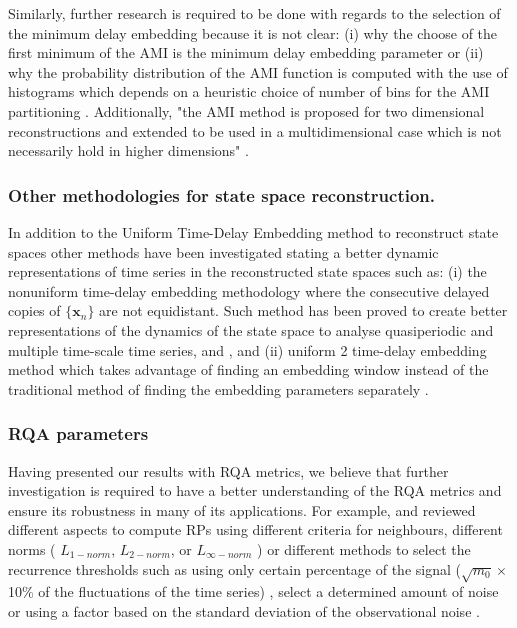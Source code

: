 Similarly, further research is required to be done with regards to the 
selection of the minimum delay embedding because it is not clear:
(i) why the choose of the first minimum of the AMI is the minimum delay 
embedding parameter \citep{kantz2003} or 
(ii) why the probability distribution of the AMI function 
is computed with the use of histograms which depends on a heuristic 
choice of number of bins for the AMI partitioning \citep{garcia2005e71}. 
Additionally, "the AMI method is proposed for two dimensional 
reconstructions and extended to be used in a multidimensional case 
which is not necessarily hold in higher dimensions" 
\citep[p. 156]{gomezgarcia2014}.


\subsubsection{Other methodologies for state space reconstruction.}
In addition to the Uniform Time-Delay Embedding method to reconstruct
state spaces other methods have been investigated stating a better 
dynamic representations of time series in the reconstructed state spaces 
such as:
(i) the nonuniform time-delay embedding methodology  
where the consecutive delayed copies of $\{ \boldsymbol{x}_n  \} $ are not
equidistant. Such method has been proved to create better representations 
of the dynamics of the state space to analyse quasiperiodic 
and multiple time-scale time series, and  
\citep{pecora2007, uzal2011, 
Quintana-Duque2012, Quintana-Duque2013, Quintana-Duque2016}, and
(ii) uniform 2 time-delay embedding method which takes advantage 
of finding an embedding window instead of the traditional method 
of finding the embedding parameters separately \citep{gomezgarcia2014}.


\subsubsection{RQA parameters}
Having presented our results with RQA metrics, we believe that further 
investigation is required to have a better understanding of the RQA metrics
and ensure its robustness in many of its applications. 
For example, \cite{marwan2007} and 
\cite{marwan2015} reviewed different aspects to 
compute RPs using different criteria for neighbours, 
different norms ( $L_{1-norm}$, $L_{2-norm}$, or $L_{\infty-norm}$ ) or 
different methods to select the recurrence thresholds such as 
using only certain percentage of the signal
($\sqrt{m_0} \times$ 10\% of the fluctuations of the time series)
\citep{letellier2006}, select a determined amount of noise or 
using a factor based on the standard deviation of the 
observational noise \cite{marwan2007}.


